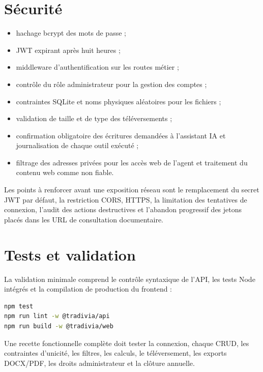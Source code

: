 \documentclass[12pt,a4paper,oneside]{report}
\begin{document}
\section{Sécurité}
\begin{itemize}
  \item hachage bcrypt des mots de passe ;
  \item JWT expirant après huit heures ;
  \item middleware d'authentification sur les routes métier ;
  \item contrôle du rôle administrateur pour la gestion des comptes ;
  \item contraintes SQLite et noms physiques aléatoires pour les fichiers ;
  \item validation de taille et de type des téléversements ;
  \item confirmation obligatoire des écritures demandées à l'assistant IA et journalisation de chaque outil exécuté ;
  \item filtrage des adresses privées pour les accès web de l'agent et traitement du contenu web comme non fiable.
\end{itemize}
Les points à renforcer avant une exposition réseau sont le remplacement du secret JWT par défaut, la restriction CORS, HTTPS, la limitation des tentatives de connexion, l'audit des actions destructives et l'abandon progressif des jetons placés dans les URL de consultation documentaire.

\section{Tests et validation}
La validation minimale comprend le contrôle syntaxique de l'API, les tests Node intégrés et la compilation de production du frontend :
\begin{lstlisting}[language=bash,caption={Commandes de validation}]
npm test
npm run lint -w @tradivia/api
npm run build -w @tradivia/web
\end{lstlisting}
Une recette fonctionnelle complète doit tester la connexion, chaque CRUD, les contraintes d'unicité, les filtres, les calculs, le téléversement, les exports DOCX/PDF, les droits administrateur et la clôture annuelle.
\end{document}
